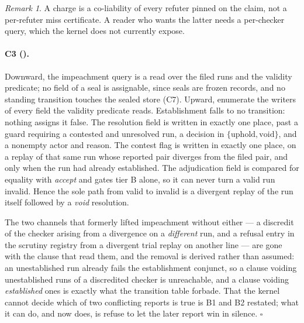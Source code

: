 \documentclass[11pt,a4paper]{article}
\theoremstyle{plain}
\theoremstyle{definition}
\theoremstyle{remark}
\newtheorem*{remark}{Remark}
\begin{document}
\begin{remark}
A charge is a co-liability of every refuter pinned on the claim, not a per-refuter miss certificate. A reader who wants the latter needs a per-checker query, which the kernel does not currently expose.
\end{remark}

\paragraph{C3 ().} Downward, the impeachment query is a read over the filed runs and the validity predicate; no field of a seal is assignable, since seals are frozen records, and no standing transition touches the sealed store (C7). Upward, enumerate the writers of every field the validity predicate reads. Establishment falls to no transition: nothing assigns it false. The resolution field is written in exactly one place, past a guard requiring a contested and unresolved run, a decision in $\{\mathrm{uphold},\mathrm{void}\}$, and a nonempty actor and reason. The contest flag is written in exactly one place, on a replay of that same run whose reported pair diverges from the filed pair, and only when the run had already established. The adjudication field is compared for equality with \emph{accept} and gates tier B alone, so it can never turn a valid run invalid. Hence the sole path from valid to invalid is a divergent replay of the run itself followed by a \emph{void} resolution.

The two channels that formerly lifted impeachment without either --- a discredit of the checker arising from a divergence on a \emph{different} run, and a refusal entry in the scrutiny registry from a divergent trial replay on another line --- are gone with the clause that read them, and the removal is derived rather than assumed: an unestablished run already fails the establishment conjunct, so a clause voiding unestablished runs of a discredited checker is unreachable, and a clause voiding \emph{established} ones is exactly what the transition table forbade. That the kernel cannot decide which of two conflicting reports is true is B1 and B2 restated; what it can do, and now does, is refuse to let the later report win in silence. $\square$
\end{document}
